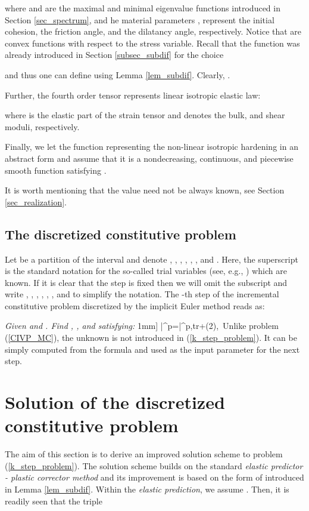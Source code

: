 \documentclass[a4paper,12pt]{article}
\theoremstyle{remark}
\numberwithin{equation}{section}
\begin{document}
where  and  are the maximal and minimal eigenvalue functions introduced in Section \ref{sec_spectrum}, and
he material parameters ,  represent the initial cohesion, the friction angle, and the dilatancy angle, respectively. Notice that  are convex functions with respect to the stress variable. Recall that the function  was already introduced in Section \ref{subsec_subdif} for the choice

and thus one can define  using Lemma \ref{lem_subdif}.
Clearly, .

Further, the fourth order tensor  represents linear isotropic elastic law:

where  is the elastic part of the strain tensor and  denotes the bulk, and shear moduli, respectively. 

Finally, we let the function  representing the non-linear isotropic hardening in an abstract form and assume that
it is a nondecreasing, continuous, and piecewise smooth function satisfying . 

It is worth mentioning that the value  need not be always known, see Section \ref{sec_realization}.

\subsection{The discretized constitutive problem}

Let  be a partition of the interval  and denote , , , , , , and . Here, the superscript  is the standard notation for the so-called trial variables (see, e.g., \cite{NPO08}) which are known. If it is clear that the step  is fixed then we will omit the subscript  and write , , , , , , and  to simplify the notation. The -th step of the incremental constitutive problem discretized by the implicit Euler method reads as: 

\medskip\noindent
{\it Given  and . Find ,  , and  satisfying:}
1mm]
\bar{\varepsilon}^p=\bar{\varepsilon}^{p,tr}+\triangle\lambda (2\cos\phi),\
Unlike problem (\ref{CIVP_MC}), the unknown  is not introduced in (\ref{k_step_problem}). It can be simply computed from the formula  and used as the input parameter for the next step.



\section{Solution of the discretized constitutive problem}
\label{sec_time_discret}

The aim of this section is to derive an improved solution scheme to problem (\ref{k_step_problem}).  The solution scheme builds on the standard {\it elastic predictor - plastic corrector method} and its improvement is based on the form of  introduced in Lemma \ref{lem_subdif}. Within the {\it elastic prediction}, we assume . Then, it is readily seen that the triple
\end{document}

